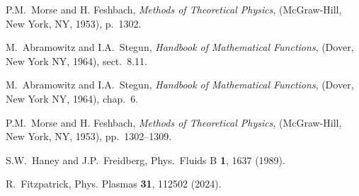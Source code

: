 \documentclass[12pt,prb,aps]{revtex4-1}
\begin{document}
\begin{thebibliography}{99}
 P.M.~Morse and H. Feshbach, {\em Methods of Theoretical Physics}, (McGraw-Hill, New York, NY, 1953), p.~1302.

 M.~Abramowitz and I.A.~Stegun, {\em Handbook of Mathematical Functions}, (Dover, New York NY, 1964), sect.~8.11.

 M.~Abramowitz and I.A.~Stegun, {\em Handbook of Mathematical Functions}, (Dover, New York NY, 1964), chap.~6.

 P.M.~Morse and H. Feshbach, {\em Methods of Theoretical Physics}, (McGraw-Hill, New York, NY, 1953), pp.~1302--1309.

 S.W.~Haney and J.P.~Freidberg, Phys.\ Fluids B {\bf 1}, 1637 (1989).

 R.~Fitzpatrick, Phys. Plasmas {\bf 31}, 112502 (2024).

\end{thebibliography}
\end{document}
